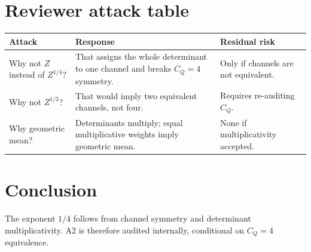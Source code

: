 \documentclass[12pt,a4paper]{article}
\begin{document}
\section{Reviewer attack table}
\begin{longtable}{p{}p{}p{}}
\toprule
Attack & Response & Residual risk\\
\midrule\endhead
Why not $Z$ instead of $Z^{1/4}$? & That assigns the whole determinant to one channel and breaks $C_Q=4$ symmetry. & Only if channels are not equivalent.\\
Why not $Z^{1/2}$? & That would imply two equivalent channels, not four. & Requires re-auditing $C_Q$.\\
Why geometric mean? & Determinants multiply; equal multiplicative weights imply geometric mean. & None if multiplicativity accepted.\\
\bottomrule
\end{longtable}
\section{Conclusion}
The exponent $1/4$ follows from channel symmetry and determinant multiplicativity.  A2 is therefore audited internally, conditional on $C_Q=4$ equivalence.
\end{document}
